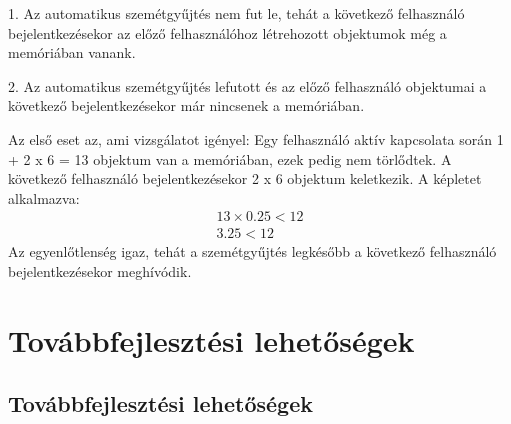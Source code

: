 \documentclass[12pt]{report}
\begin{document}
1. Az automatikus szemétgyűjtés nem fut le, tehát a következő felhasználó bejelentkezésekor az előző felhasználóhoz létrehozott objektumok még a memóriában vanank.

2. Az automatikus szemétgyűjtés lefutott és az előző felhasználó objektumai a következő bejelentkezésekor már nincsenek a memóriában.

Az első eset az, ami vizsgálatot igényel:
Egy felhasználó aktív kapcsolata során 1 + 2 x 6 = 13 objektum van a memóriában, ezek pedig nem törlődtek.
A következő felhasználó bejelentkezésekor 2 x 6 objektum keletkezik. A képletet alkalmazva:
\begin{align*}
    13 \times 0.25 < 12 \\
    3.25 < 12
\end{align*}
Az egyenlőtlenség igaz, tehát a szemétgyűjtés legkésőbb a következő felhasználó bejelentkezésekor meghívódik.


\chapter{Továbbfejlesztési lehetőségek}
\section{Továbbfejlesztési lehetőségek}
\end{document}
